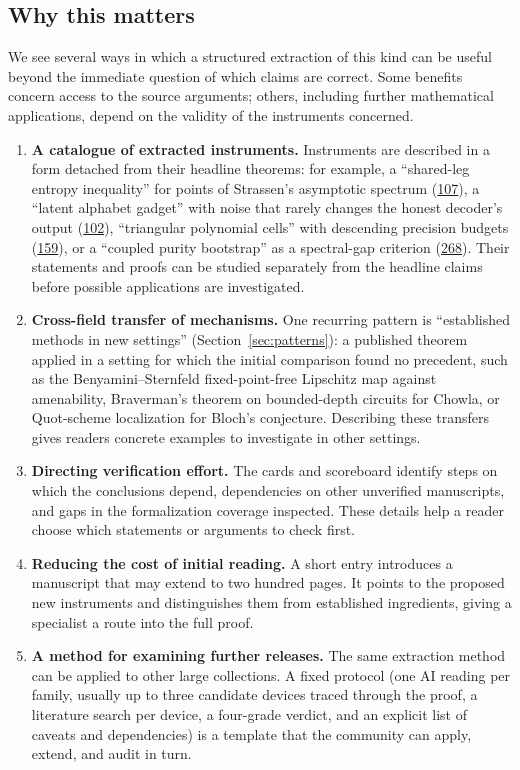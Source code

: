 \documentclass[11pt]{article}
\begin{document}
\subsection{Why this matters}
We see several ways in which a structured extraction of this kind can be useful beyond the immediate question of which claims are correct. Some benefits concern access to the source arguments; others, including further mathematical applications, depend on the validity of the instruments concerned.
\begin{enumerate}[label=(\arabic*)]
\item \textbf{A catalogue of extracted instruments.} Instruments are described in a form detached from their headline theorems: for example, a ``shared-leg entropy inequality'' for points of Strassen's asymptotic spectrum (\hyperref[fam:107]{107}), a ``latent alphabet gadget'' with noise that rarely changes the honest decoder's output (\hyperref[fam:102]{102}), ``triangular polynomial cells'' with descending precision budgets (\hyperref[fam:159]{159}), or a ``coupled purity bootstrap'' as a spectral-gap criterion (\hyperref[fam:268]{268}). Their statements and proofs can be studied separately from the headline claims before possible applications are investigated.
\item \textbf{Cross-field transfer of mechanisms.} One recurring pattern is ``established methods in new settings'' (Section~\ref{sec:patterns}): a published theorem applied in a setting for which the initial comparison found no precedent, such as the Benyamini--Sternfeld fixed-point-free Lipschitz map against amenability, Braverman's theorem on bounded-depth circuits for Chowla, or Quot-scheme localization for Bloch's conjecture. Describing these transfers gives readers concrete examples to investigate in other settings.
\item \textbf{Directing verification effort.} The cards and scoreboard identify steps on which the conclusions depend, dependencies on other unverified manuscripts, and gaps in the formalization coverage inspected. These details help a reader choose which statements or arguments to check first.
\item \textbf{Reducing the cost of initial reading.} A short entry introduces a manuscript that may extend to two hundred pages. It points to the proposed new instruments and distinguishes them from established ingredients, giving a specialist a route into the full proof.
\item \textbf{A method for examining further releases.} The same extraction method can be applied to other large collections. A fixed protocol (one AI reading per family, usually up to three candidate devices traced through the proof, a literature search per device, a four-grade verdict, and an explicit list of caveats and dependencies) is a template that the community can apply, extend, and audit in turn.

\end{enumerate}
\end{document}
